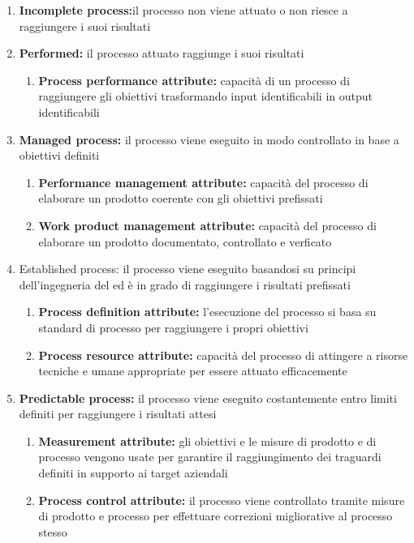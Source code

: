 \documentclass[12pt,a4paper]{article}
\begin{document}
	\begin{enumerate}
		\item\textbf{Incomplete process:}il processo non viene attuato o non riesce a raggiungere i	suoi risultati
		
		\item\textbf{Performed:} il processo attuato raggiunge i suoi risultati
		\begin{enumerate}
			\item\textbf{Process performance attribute:} capacità di un processo di raggiungere gli obiettivi trasformando input identificabili in output identificabili
		\end{enumerate}
		
		\item \textbf{Managed process:} il processo viene eseguito in modo controllato in base a obiettivi definiti
		\begin{enumerate}
			\item\textbf{Performance management attribute:} capacità del processo di elaborare un prodotto coerente con gli obiettivi prefissati
			\item\textbf{ Work product management attribute:} capacità del processo di elaborare un prodotto documentato, controllato e verficato
		\end{enumerate}
		
		\item{Established process:} il processo viene eseguito basandosi su principi dell'ingegneria del   ed è in grado di raggiungere i risultati prefissati
		\begin{enumerate}
			\item\textbf {Process definition attribute: } l'esecuzione del processo si basa su standard di processo per raggiungere i propri obiettivi
			\item \textbf{Process resource attribute: }capacità del processo di attingere a risorse
			tecniche e umane appropriate per essere attuato efficacemente
		\end{enumerate}
		
		\item\textbf{Predictable process:} il processo viene eseguito costantemente entro limiti definiti
		per raggiungere i risultati attesi
		\begin{enumerate}
			\item \textbf{ Measurement attribute:} gli obiettivi e le misure di prodotto e di processo vengono usate per garantire il raggiungimento dei traguardi definiti in		supporto ai target aziendali
			\item\textbf{ Process control attribute:} il processo viene controllato tramite misure di prodotto e processo per effettuare correzioni migliorative al processo stesso
		\end{enumerate}
		

\end{enumerate}
\end{document}
